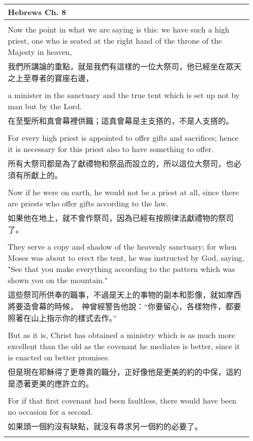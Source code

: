 \newpage
\begin{tabularx}{\textwidth}{p{}}
\hline
Hebrews Ch. 8 \\
\hline \\
Now the point in what we are saying is this: we have such a high priest, one who is seated at the right hand of the throne of the Majesty in heaven, \\
我們所講論的重點，就是我們有這樣的一位大祭司，他已經坐在眾天之上至尊者的寶座右邊， \\ \\
a minister in the sanctuary and the true tent which is set up not by man but by the Lord. \\
在至聖所和真會幕裡供職；這真會幕是主支搭的，不是人支搭的。 \\ \\
For every high priest is appointed to offer gifts and sacrifices; hence it is necessary for this priest also to have something to offer. \\
所有大祭司都是為了獻禮物和祭品而設立的，所以這位大祭司，也必須有所獻上的。 \\ \\
Now if he were on earth, he would not be a priest at all, since there are priests who offer gifts according to the law. \\
如果他在地上，就不會作祭司，因為已經有按照律法獻禮物的祭司了。 \\ \\
They serve a copy and shadow of the heavenly sanctuary; for when Moses was about to erect the tent, he was instructed by God, saying, "See that you make everything according to the pattern which was shown you on the mountain." \\
這些祭司所供奉的職事，不過是天上的事物的副本和影像，就如摩西將要造會幕的時候，　神曾經警告他說：“你要留心，各樣物件，都要照著在山上指示你的樣式去作。” \\ \\
But as it is, Christ has obtained a ministry which is as much more excellent than the old as the covenant he mediates is better, since it is enacted on better promises. \\
但是現在耶穌得了更尊貴的職分，正好像他是更美的約的中保，這約是憑著更美的應許立的。 \\ \\
For if that first covenant had been faultless, there would have been no occasion for a second. \\
如果頭一個約沒有缺點，就沒有尋求另一個約的必要了。 \\ \\

\end{tabularx}
